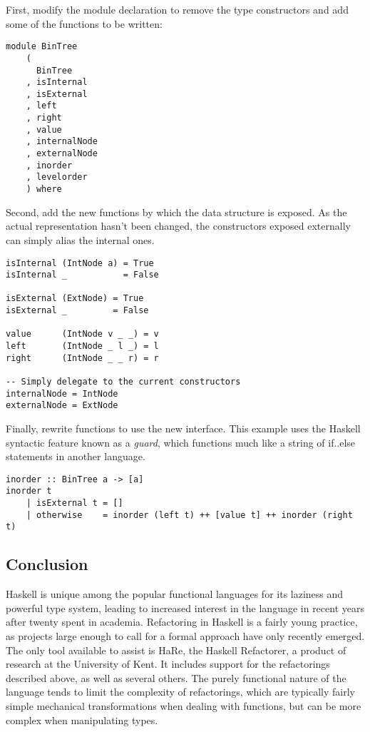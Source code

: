 First, modify the module declaration to remove the type constructors and add some of the functions to be written:

\begin{verbatim}
module BinTree
    (
      BinTree
    , isInternal
    , isExternal
    , left
    , right
    , value
    , internalNode
    , externalNode
    , inorder
    , levelorder
    ) where
\end{verbatim}

Second, add the new functions by which the data structure is exposed.  As the actual representation hasn't been changed, the constructors exposed externally can simply alias the internal ones.

\begin{verbatim}
isInternal (IntNode a) = True
isInternal _           = False

isExternal (ExtNode) = True
isExternal _         = False

value      (IntNode v _ _) = v
left       (IntNode _ l _) = l
right      (IntNode _ _ r) = r

-- Simply delegate to the current constructors
internalNode = IntNode
externalNode = ExtNode
\end{verbatim}

Finally, rewrite functions to use the new interface.  This example uses the Haskell syntactic feature known as a \textit{guard}, which functions much like a string of if..else statements in another language.

\begin{verbatim}
inorder :: BinTree a -> [a]
inorder t
    | isExternal t = []
    | otherwise    = inorder (left t) ++ [value t] ++ inorder (right t)
\end{verbatim}

\subsection{Conclusion}

Haskell is unique among the popular functional languages for its laziness and powerful type system, leading to increased interest in the language in recent years after twenty spent in academia.
Refactoring in Haskell is a fairly young practice, as projects large enough to call for a formal approach have only recently emerged.
The only tool available to assist is HaRe, the Haskell Refactorer\cite{li2006refactoring}, a product of research at the University of Kent.
It includes support for the refactorings described above, as well as several others.
The purely functional nature of the language tends to limit the complexity of refactorings, which are typically fairly simple mechanical transformations when dealing with functions, but can be more complex when manipulating types.

